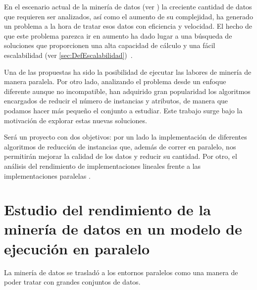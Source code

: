 



En el escenario actual de la minería de datos (ver ) la creciente cantidad de datos que requieren ser analizados, así como el aumento de su complejidad,  ha generado un problema a la hora de tratar esos datos con eficiencia y velocidad. El hecho de que este problema parezca ir en aumento ha dado lugar a una búsqueda de soluciones que proporcionen una alta capacidad de cálculo y una fácil escalabilidad (ver \ref{sec:DefEscalabilidad})~\cite{DataMiningConcepts}. 

Una de las propuestas ha sido la posibilidad de ejecutar las labores de minería de manera paralela. Por otro lado, analizando el problema desde un enfoque diferente aunque no incompatible, han adquirido gran popularidad los algoritmos encargados de reducir el número de instancias y atributos, de manera que podamos hacer más pequeño el conjunto a estudiar. Este trabajo surge bajo la motivación de explorar estas nuevas soluciones. 

Será un proyecto con dos objetivos: por un lado la implementación de diferentes algoritmos de reducción de instancias que, además de correr en paralelo, nos permitirán mejorar la calidad de los datos y reducir su cantidad. Por otro, el análisis del rendimiento de implementaciones lineales frente a las implementaciones paralelas %
.

\section{Estudio del rendimiento de la minería de datos en un modelo de ejecución en paralelo}

La minería de datos se trasladó a los entornos paralelos como una manera de poder tratar con grandes conjuntos de datos.


